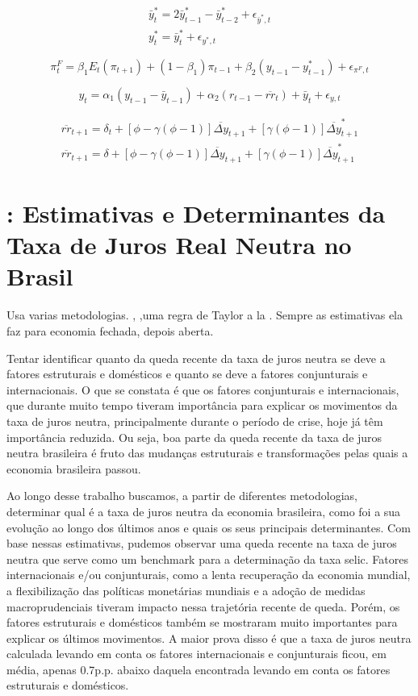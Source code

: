 $$
\begin{array}{l}
\bar{y}_{t}^{*}=2 \bar{y}_{t-1}^{*}-\bar{y}_{t-2}^{*}+\epsilon_{\bar{y}^{*}, t} \\
y_{t}^{*}=\bar{y}_{t}^{*}+\epsilon_{y^{*}, t}
\end{array}
$$

$$
\pi_{t}^{F}=\beta_{1} E_{t}\left(\pi_{t+1}\right)+\left(1-\beta_{1}\right) \pi_{t-1}+\beta_{2}\left(y_{t-1}-y_{t-1}^{*}\right)+\epsilon_{\pi^{F}, t}
$$

$$
y_{t}=\alpha_{1}\left(y_{t-1}-\bar{y}_{t-1}\right)+\alpha_{2}\left(r_{t-1}-\overline{r r}_{t}\right)+\bar{y}_{t}+\epsilon_{y, t}
$$

$$
\begin{array}{l}
\overline{r r}_{t+1}=\delta_{t}+[\phi-\gamma(\phi-1)] \overline{\Delta y}_{t+1}+[\gamma(\phi-1)] \overline{\Delta y}_{t+1}^{*} \\
\overline{r r}_{t+1}=\delta+[\phi-\gamma(\phi-1)] \overline{\Delta y}_{t+1}+[\gamma(\phi-1)] \overline{\Delta y}_{t+1}^{*}
\end{array}
$$
%
%
\section{\citet{Gottlieb:2013}: Estimativas e Determinantes da Taxa de Juros Real Neutra no Brasil}

Usa varias metodologias. \citet{LW:2003}, \citet{Aurelio:2011},uma regra de Taylor a la \citet{Barbosa:2016}. Sempre as estimativas ela faz para economia fechada, depois aberta.

Tentar identificar quanto da queda recente da taxa de juros neutra se deve a fatores estruturais e domésticos e quanto se deve a fatores conjunturais e internacionais. O que se constata é que os fatores conjunturais e internacionais, que durante muito
tempo tiveram importância para explicar os movimentos da taxa de juros neutra, principalmente durante o período de crise, hoje já têm importância reduzida. Ou seja, boa parte da queda recente da taxa de juros neutra brasileira é fruto das mudanças estruturais e transformações pelas quais a economia brasileira passou.

Ao longo desse trabalho buscamos, a partir de diferentes metodologias, determinar qual é a taxa de juros neutra da economia brasileira, como foi a sua evolução ao longo dos últimos anos e quais os seus principais determinantes. Com base nessas estimativas, pudemos observar uma queda recente na taxa de juros
neutra que serve como um benchmark para a determinação da taxa selic. Fatores internacionais e/ou conjunturais, como a lenta recuperação da economia mundial, a flexibilização das políticas monetárias mundiais e a adoção de medidas macroprudenciais tiveram impacto nessa trajetória recente de queda. Porém, os fatores estruturais e domésticos também se mostraram muito importantes para explicar os últimos movimentos. A maior prova disso é que a taxa de juros neutra calculada levando em conta os fatores internacionais e conjunturais ficou, em média, apenas 0.7p.p. abaixo daquela encontrada levando em conta os fatores estruturais e domésticos.

